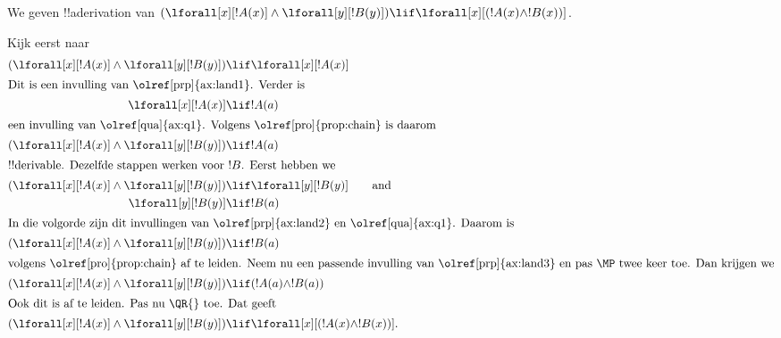 \documentclass[../../../include/open-logic-section]{subfiles}
\begin{document}


\begin{ex}
We geven !!a{derivation} van $(\lforall[x][!A(x)] \land
\lforall[y][!B(y)]) \lif \lforall[x][(!A(x) \land !B(x))]$.

Kijk eerst naar
\begin{align*}
  (\lforall[x][!A(x)] \land \lforall[y][!B(y)]) & \lif \lforall[x][!A(x)]\\
  \intertext{Dit is een invulling van \olref[prp]{ax:land1}. Verder is}
  \lforall[x][!A(x)] & \lif !A(a) \\
  \intertext{een invulling van \olref[qua]{ax:q1}. Volgens \olref[pro]{prop:chain} is daarom}
  (\lforall[x][!A(x)] \land \lforall[y][!B(y)]) & \lif !A(a) \\
  \intertext{!!{derivable}. Dezelfde stappen werken voor $!B$. Eerst hebben we}
  (\lforall[x][!A(x)] \land \lforall[y][!B(y)]) & \lif \lforall[y][!B(y)] \qquad\text{and}\\
    \lforall[y][!B(y)] & \lif !B(a)\\
    \intertext{In die volgorde zijn dit invullingen van \olref[prp]{ax:land2} en \olref[qua]{ax:q1}. Daarom is}
    (\lforall[x][!A(x)] \land \lforall[y][!B(y)]) & \lif !B(a)\\
    \intertext{volgens \olref[pro]{prop:chain} af te leiden. Neem nu een passende invulling van \olref[prp]{ax:land3} en pas~\MP twee keer toe. Dan krijgen we}
    (\lforall[x][!A(x)] \land \lforall[y][!B(y)]) & \lif (!A(a) \land !B(a))\\
    \intertext{Ook dit is af te leiden. Pas nu \QR{} toe. Dat geeft}
(\lforall[x][!A(x)] \land \lforall[y][!B(y)]) & \lif \lforall[x][(!A(x) \land !B(x))].
\end{align*}
\end{ex}
\end{document}
